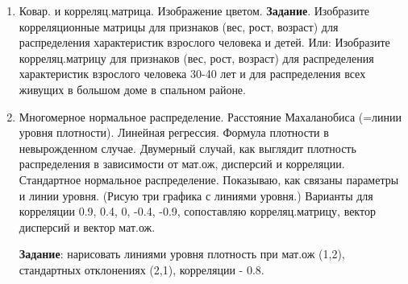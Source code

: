 \begin{enumerate}
\item	Ковар. и корреляц.матрица. Изображение цветом. \textbf{Задание}. Изобразите корреляционные матрицы для признаков (вес, рост, возраст) для распределения характеристик взрослого человека и детей.
    Или:  Изобразите корреляц.матрицу для признаков (вес, рост, возраст) для распределения характеристик взрослого человека 30-40 лет и для распределения всех живущих в большом доме в спальном районе.
\item	Многомерное нормальное распределение. Расстояние Махаланобиса (=линии уровня плотности). Линейная регрессия. Формула плотности в невырожденном случае. Двумерный случай, как выглядит плотность распределения в зависимости от мат.ож, дисперсий и корреляции. Стандартное нормальное распределение.
    Показываю, как связаны параметры и линии уровня. (Рисую три графика с линиями уровня.)  Варианты для корреляции 0.9, 0.4, 0, -0.4, -0.9, сопоставляю корреляц.матрицу, вектор дисперсий и вектор мат.ож.

    \textbf{Задание}: нарисовать линиями уровня плотность при мат.ож (1,2), стандартных отклонениях (2,1), корреляции - 0.8.
\end{enumerate}
